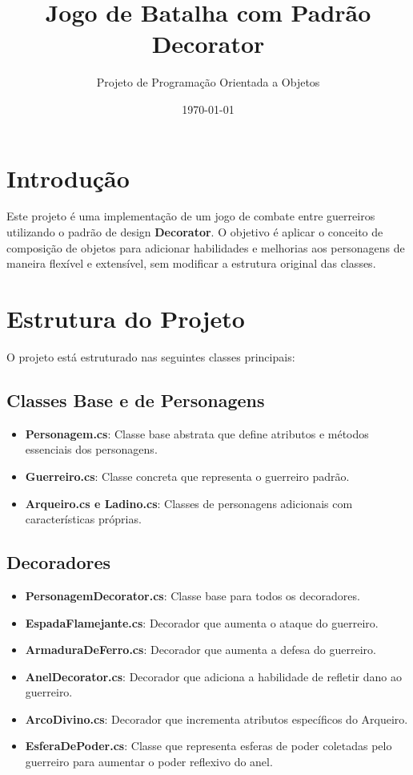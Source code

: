 \documentclass{article}
\title{Jogo de Batalha com Padrão Decorator}
\author{Projeto de Programação Orientada a Objetos}
\date{\today}
\begin{document}
\maketitle

\section*{Introdução}
Este projeto é uma implementação de um jogo de combate entre guerreiros utilizando o padrão de design \textbf{Decorator}. O objetivo é aplicar o conceito de composição de objetos para adicionar habilidades e melhorias aos personagens de maneira flexível e extensível, sem modificar a estrutura original das classes.

\section*{Estrutura do Projeto}
O projeto está estruturado nas seguintes classes principais:

\subsection*{Classes Base e de Personagens}
\begin{itemize}
    \item \textbf{Personagem.cs}: Classe base abstrata que define atributos e métodos essenciais dos personagens.
    \item \textbf{Guerreiro.cs}: Classe concreta que representa o guerreiro padrão.
    \item \textbf{Arqueiro.cs e Ladino.cs}: Classes de personagens adicionais com características próprias.
\end{itemize}

\subsection*{Decoradores}
\begin{itemize}
    \item \textbf{PersonagemDecorator.cs}: Classe base para todos os decoradores.
    \item \textbf{EspadaFlamejante.cs}: Decorador que aumenta o ataque do guerreiro.
    \item \textbf{ArmaduraDeFerro.cs}: Decorador que aumenta a defesa do guerreiro.
    \item \textbf{AnelDecorator.cs}: Decorador que adiciona a habilidade de refletir dano ao guerreiro.
    \item \textbf{ArcoDivino.cs}: Decorador que incrementa atributos específicos do Arqueiro.
    \item \textbf{EsferaDePoder.cs}: Classe que representa esferas de poder coletadas pelo guerreiro para aumentar o poder reflexivo do anel.
\end{itemize}
\end{document}

